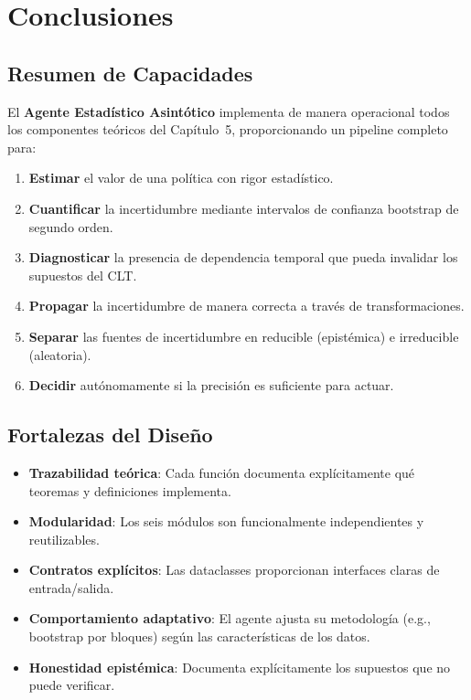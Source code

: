 \documentclass[12pt,a4paper]{article}
\begin{document}
\section{Conclusiones}

\subsection{Resumen de Capacidades}

El \textbf{Agente Estadístico Asintótico} implementa de manera operacional todos los componentes teóricos del Capítulo~5, proporcionando un pipeline completo para:

\begin{enumerate}
	\item \textbf{Estimar} el valor de una política con rigor estadístico.
	\item \textbf{Cuantificar} la incertidumbre mediante intervalos de confianza bootstrap de segundo orden.
	\item \textbf{Diagnosticar} la presencia de dependencia temporal que pueda invalidar los supuestos del CLT.
	\item \textbf{Propagar} la incertidumbre de manera correcta a través de transformaciones.
	\item \textbf{Separar} las fuentes de incertidumbre en reducible (epistémica) e irreducible (aleatoria).
	\item \textbf{Decidir} autónomamente si la precisión es suficiente para actuar.
\end{enumerate}

\subsection{Fortalezas del Diseño}

\begin{itemize}
	\item \textbf{Trazabilidad teórica}: Cada función documenta explícitamente qué teoremas y definiciones implementa.
	\item \textbf{Modularidad}: Los seis módulos son funcionalmente independientes y reutilizables.
	\item \textbf{Contratos explícitos}: Las dataclasses proporcionan interfaces claras de entrada/salida.
	\item \textbf{Comportamiento adaptativo}: El agente ajusta su metodología (e.g., bootstrap por bloques) según las características de los datos.
	\item \textbf{Honestidad epistémica}: Documenta explícitamente los supuestos que no puede verificar.
\end{itemize}
\end{document}
